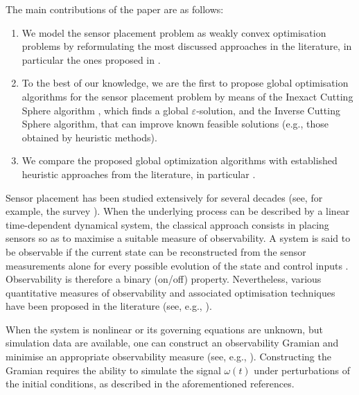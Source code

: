 \documentclass[12pt]{amsart}
\theoremstyle{plain}
\theoremstyle{definition}
\begin{document}
The main contributions of the paper are as follows:

\begin{enumerate}
    \item We model the sensor placement problem as weakly convex optimisation problems by reformulating the most discussed approaches in the literature, in particular the ones proposed in \cite{joshi2008sensor, singh2005determining}.
    \item To the best of our knowledge, we are the first to propose global optimisation algorithms for the sensor placement problem by means of the Inexact Cutting Sphere algorithm \cite{bednarczuk2026outer}, which finds a global $\varepsilon$-solution, and the Inverse Cutting Sphere algorithm, that can improve known feasible solutions (e.g., those obtained by heuristic methods).
    \item We compare the proposed global optimization algorithms with established heuristic approaches from the literature, in particular \cite{manohar2017data}.
\end{enumerate}


Sensor placement has been studied extensively for several decades (see, for example, the survey \cite{padula1999optimization}). When the underlying process can be described by a linear time-dependent dynamical system, the classical approach consists in placing sensors so as to maximise a suitable measure of observability. A system is said to be observable if the current state can be reconstructed from the sensor measurements alone for every possible evolution of the state and control inputs \cite{kalman1970lectures}. Observability is therefore a binary (on/off) property. Nevertheless, various quantitative measures of observability and associated optimisation techniques have been proposed in the literature (see, e.g., \cite{singh2005determining,polyak2013lmi,zhang2016optimal,zhang2017sensor,gagliardi2023traffic,gagliardi2024joint}).

When the system is nonlinear or its governing equations are unknown, but simulation data are available, one can construct an observability Gramian and minimise an appropriate observability measure (see, e.g., \cite{singh2005determining,krener2009measures,hinson2014observability,cellini2023empirical}). Constructing the Gramian requires the ability to simulate the signal $\omega(t)$ under perturbations of the initial conditions, as described in the aforementioned references.
\end{document}
